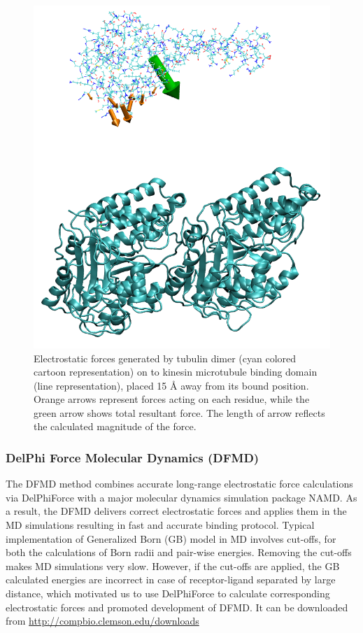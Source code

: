 \documentclass[9pt,tutorial]{livecoms}
\begin{document}
\begin{figure}[hbt!]
\includegraphics[width=\linewidth]{Figure_14.png}
\caption{Electrostatic forces generated by tubulin dimer (cyan colored cartoon representation) on to kinesin microtubule binding domain (line representation), placed 15 $\text{\AA}$ away from its bound position. Orange arrows represent forces acting on each residue, while the green arrow shows total resultant force. The length of arrow reflects the calculated magnitude of the force.}
\label{fig:delphiforce}
\end{figure}

\subsubsection{DelPhi Force Molecular Dynamics (DFMD)}

The DFMD method\cite{peng2019DFMD} combines accurate long-range electrostatic force calculations via DelPhiForce with a major molecular dynamics simulation package NAMD\cite{phillips2005scalable}.  As a result, the DFMD delivers correct electrostatic forces and applies them in the MD simulations resulting in fast and accurate binding protocol. Typical implementation of Generalized Born (GB)\cite{onufriev2000modification} model in MD involves cut-offs, for both the calculations of Born radii and pair-wise energies. Removing the cut-offs makes MD simulations very slow. However, if the cut-offs are applied, the GB calculated energies are incorrect in case of receptor-ligand separated by large distance, which motivated us to use DelPhiForce to calculate corresponding electrostatic forces and promoted development of DFMD. It can be downloaded from \url{http://compbio.clemson.edu/downloads}
\end{document}
